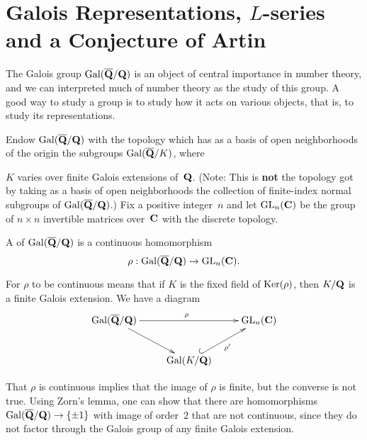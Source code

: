 \section{Galois Representations, $L$-series and a Conjecture of
  Artin}\label{sec:artin}
The Galois group $\operatorname{Gal}(\overline{\mathbf{Q}}/\mathbf{Q})$ is an object of central importance
in number theory, and we can interpreted much of number theory as the
study of this group.  A good way to study a group is to study how it
acts on various objects, that is, to study its representations.

Endow $\operatorname{Gal}(\overline{\mathbf{Q}}/\mathbf{Q})$ with the topology which has as a basis of open neighborhoods
of the origin the subgroups $\operatorname{Gal}(\overline{\mathbf{Q}}/K)$, where~{$K$ varies
over finite Galois extensions of~$\mathbf{Q}$. (Note: This is {\bf not} the
topology got by taking as a basis of open neighborhoods the collection
of finite-index normal subgroups of $\operatorname{Gal}(\overline{\mathbf{Q}}/\mathbf{Q})$.)
Fix a positive integer~$n$ and let $\operatorname{GL}_n(\mathbf{C})$ be the group of
$n\times n$ invertible matrices over~$\mathbf{C}$ with the discrete topology.

\begin{definition}
A  of $\operatorname{Gal}(\overline{\mathbf{Q}}/\mathbf{Q})$
is a continuous homomorphism
$$
  \rho:\operatorname{Gal}(\overline{\mathbf{Q}}/\mathbf{Q})\to \operatorname{GL}_n(\mathbf{C}).
$$
\end{definition}
For $\rho$ to be continuous means that if $K$ is the fixed
field of $\operatorname{Ker}(\rho)$, then $K/\mathbf{Q}$ is a finite Galois extension.  We have
a diagram
$$\xymatrix{ {\galq}\ar[rr]^{\rho}\ar[dr]& &{\GL_n(\C)}\\
&{\Gal(K/\Q)}\ar@{^{(}->}[ur]_{\rho'}}
$$ 
\begin{remark}
  That $\rho$ is continuous implies that the image of $\rho$ is
  finite, but the converse is not true.  Using Zorn's lemma, one can
  show that there are homomorphisms $\operatorname{Gal}(\overline{\mathbf{Q}}/\mathbf{Q})\to\{\pm 1\}$ with image of
  order~$2$ that are not continuous, since they do not factor through
  the Galois group of any finite Galois extension.
\end{remark}

}
